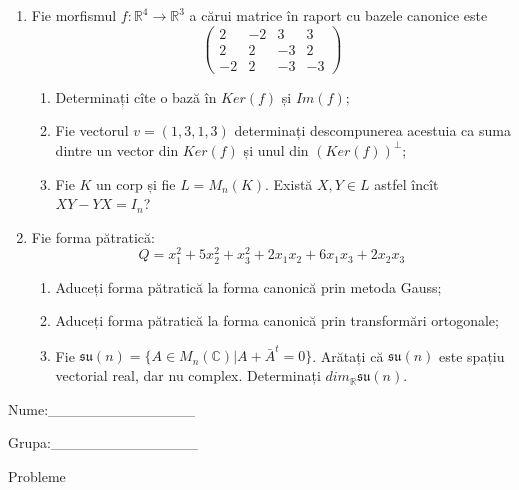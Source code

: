 \documentclass{article}
\begin{document}
\begin{enumerate}
 \item Fie morfismul $f:\mathbb{R}^4 \to \mathbb{R}^3$ a cărui matrice în raport cu bazele canonice este
$$\begin{pmatrix}
2&-2&3&3\\
2&2&-3&2\\
-2&2&-3&-3
\end{pmatrix}$$

\begin{enumerate}
\item Determinați cîte o bază în $Ker(f)$ și $Im(f)$;
\item Fie vectorul $v=(1,3,1,3)$ determinați descompunerea acestuia ca suma dintre un vector din $Ker(f)$ și unul din $(Ker(f))^\perp$;
\item Fie $K$ un corp și fie $L=M_n(K)$. Există $X,Y \in L$ astfel încît $XY-YX=I_n$?  
\end{enumerate}
\item Fie forma pătratică:
$$Q= x_1^2+5x_2^2+x_3^2+2x_1x_2+6x_1x_3+2x_2x_3$$

\begin{enumerate}
\item Aduceți forma pătratică la forma canonică prin metoda Gauss;
\item Aduceți forma pătratică la forma canonică prin transformări ortogonale;
\item Fie $\mathfrak{su}(n)=\{ A \in M_n(\mathbb{C}) | A+\bar{A}^t=0\}$. Arătați că $\mathfrak{su}(n)$ este spațiu vectorial real, dar nu complex.
Determinați $dim_{\mathbb{R}}\mathfrak{su}(n)$.
\end{enumerate}
\end{enumerate}
\newpage
\begin{flushright}
Nume:\_\_\_\_\_\_\_\_\_\_\_\_\_\_
 
 
Grupa:\_\_\_\_\_\_\_\_\_\_\_\_\_\_
\end{flushright}
\begin{center}
\vspace{2cm}
{\Large Probleme}
\vspace{2cm}
\end{center}
\end{document}

